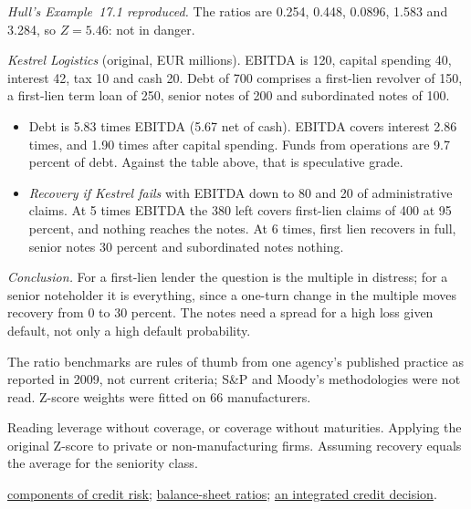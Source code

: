 \begin{qfmethod}
 \emph{Hull's Example~17.1 reproduced.} The ratios are 0.254, 0.448, 0.0896, 1.583 and 3.284, so $Z=5.46$: not in danger.

\emph{Kestrel Logistics} (original, EUR millions). EBITDA is 120, capital spending 40, interest 42, tax 10 and cash 20. Debt of 700 comprises a first-lien revolver of 150, a first-lien term loan of 250, senior notes of 200 and subordinated notes of 100.
\begin{itemize}
\item Debt is 5.83 times EBITDA (5.67 net of cash). EBITDA covers interest 2.86 times, and 1.90 times after capital spending. Funds from operations are 9.7 percent of debt. Against the table above, that is speculative grade.
\item \emph{Recovery if Kestrel fails} with EBITDA down to 80 and 20 of administrative claims. At 5 times EBITDA the 380 left covers first-lien claims of 400 at 95 percent, and nothing reaches the notes. At 6 times, first lien recovers in full, senior notes 30 percent and subordinated notes nothing.
\end{itemize}
\emph{Conclusion.} For a first-lien lender the question is the multiple in distress; for a senior noteholder it is everything, since a one-turn change in the multiple moves recovery from 0 to 30 percent. The notes need a spread for a high loss given default, not only a high default probability.

 The ratio benchmarks are rules of thumb from one agency's published practice as reported in 2009, not current criteria; S\&P and Moody's methodologies were not read. Z-score weights were fitted on 66 manufacturers.

 Reading leverage without coverage, or coverage without maturities. Applying the original Z-score to private or non-manufacturing firms. Assuming recovery equals the average for the seniority class.

 \hyperref[def:credit-risk-components]{components of credit risk}; \hyperref[meth:balance-sheet-ratios]{balance-sheet ratios}; \hyperref[ex:integrated-credit-decision]{an integrated credit decision}.

\end{qfmethod}


